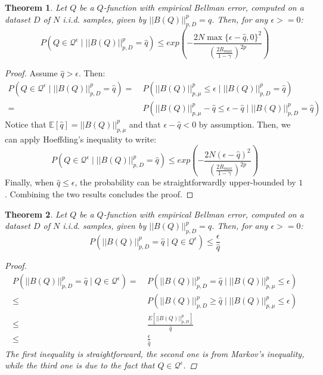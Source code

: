 \documentclass{article}
\newtheorem{theorem}{Theorem}
\begin{document}
\begin{theorem}
Let $Q$ be a $Q$-function with empirical Bellman error, computed on a dataset $D$ of $N$ i.i.d. samples, given by $||B(Q)||_{p,D}^p = \hat{q}$. Then, for any $\epsilon >= 0$:
\begin{equation}
P\left(Q\in\mathcal{Q}^{\epsilon} \mid ||B(Q)||_{p,D}^p = \hat{q}\right) \leq exp\left( -\frac{2N\max\{\epsilon-\hat{q},0\}^2}{\left(\frac{2R_{max}}{1-\gamma}\right)^{2p}} \right)
\end{equation}
\end{theorem}
\begin{proof}
Assume $\hat{q}>\epsilon$. Then:
\begin{align*}
P\left(Q\in\mathcal{Q}^{\epsilon} \mid ||B(Q)||_{p,D}^p = \hat{q}\right) =\ & 
P\left(|| B(Q) ||_{p,\mu}^p \leq \epsilon \mid ||B(Q)||_{p,D}^p = \hat{q}\right) \\ =\ &
P\left(|| B(Q) ||_{p,\mu}^p - \hat{q} \leq \epsilon - \hat{q} \mid ||B(Q)||_{p,D}^p = \hat{q}\right)
\end{align*}
Notice that $\mathbb{E}[\hat{q}] = || B(Q) ||_{p,\mu}^p$ and that $\epsilon - \hat{q} < 0$ by assumption. Then, we can apply Hoeffding's inequality to write:
\begin{equation*}
P\left(Q\in\mathcal{Q}^{\epsilon} \mid ||B(Q)||_{p,D}^p = \hat{q}\right) \leq exp\left( -\frac{2N(\epsilon-\hat{q})^2}{\left(\frac{2R_{max}}{1-\gamma}\right)^{2p}} \right)
\end{equation*}
Finally, when $\hat{q} \leq \epsilon$, the probability can be straightforwardly upper-bounded by $1$. Combining the two results concludes the proof.
\end{proof}
\begin{theorem}
Let $Q$ be a $Q$-function with empirical Bellman error, computed on a dataset $D$ of $N$ i.i.d. samples, given by $||B(Q)||_{p,D}^p = \hat{q}$. Then, for any $\epsilon >= 0$:
\begin{equation*}
P\left( ||B(Q)||_{p,D}^p = \hat{q} \mid Q\in\mathcal{Q}^{\epsilon} \right) \leq \frac{\epsilon}{\hat{q}}
\end{equation*}
\begin{proof}
\begin{align*}
P\left( ||B(Q)||_{p,D}^p = \hat{q} \mid Q\in\mathcal{Q}^{\epsilon} \right) =\ &
P\left( ||B(Q)||_{p,D}^p = \hat{q} \mid || B(Q) ||_{p,\mu}^p \leq \epsilon \right)\\ \leq\ &
P\left( ||B(Q)||_{p,D}^p \geq \hat{q} \mid || B(Q) ||_{p,\mu}^p \leq \epsilon \right)\\ \leq\ &
\frac{E[||B(Q)||_{p,D}^p]}{\hat{q}}\\ \leq\ &
\frac{\epsilon}{\hat{q}}
\end{align*}
The first inequality is straightforward, the second one is from Markov's inequality, while the third one is due to the fact that $Q\in\mathcal{Q}^{\epsilon}$.
\end{proof}
\end{theorem}
\end{document}
